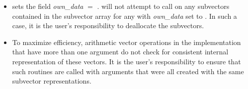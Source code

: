 \begin{itemize}
                                        
\item
  {\warn} sets the field {\em own\_data} $=$
  .   will not attempt to call
   on any subvectors contained in the subvector array
  for any  with {\em own\_data} set to . In
  such a case, it is the user's responsibility to deallocate the
  subvectors.

\item
  {\warn}To maximize efficiency, arithmetic vector operations in the
  {\nvecmanyvector} implementation that have more than one
   argument do not check for consistent internal
  representation of these vectors. It is the user's responsibility to
  ensure that such routines are called with  arguments
  that were all created with the same subvector representations.

\end{itemize}


